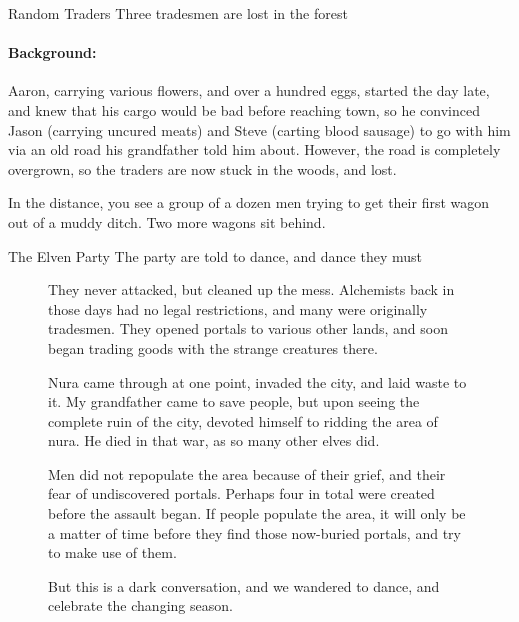 \begin{multicols}{2}
\begin{rollchart}
\end{rollchart}

{Random Traders}%
{Three tradesmen are lost in the forest}%

\paragraph{Background:}
Aaron, carrying various flowers, and over a hundred eggs, started the day late, and knew that his cargo would be bad before reaching \gls{town}, so he convinced Jason (carrying uncured meats) and Steve (carting blood sausage) to go with him via an old road his grandfather told him about.
However, the road is completely overgrown, so the traders are now stuck in the woods, and lost.

\begin{boxtext}
  In the distance, you see a group of a dozen men trying to get their first wagon out of a muddy ditch.
  Two more wagons sit behind.
\end{boxtext}


{The Elven Party}%
{The party are told to dance, and dance they must}%

\begin{figure*}[b]
\begin{speechtext}

  They never attacked, but cleaned up the mess.  Alchemists back in those days had no legal restrictions, and many were originally tradesmen.  They opened portals to various other lands, and soon began trading goods with the strange creatures there.

  Nura came through at one point, invaded the city, and laid waste to it.  My grandfather came to save people, but upon seeing the complete ruin of the city, devoted himself to ridding the area of nura.  He died in that war, as so many other elves did.

  Men did not repopulate the area because of their grief, and their fear of undiscovered portals.
  Perhaps four in total were created before the assault began.
  If people populate the area, it will only be a matter of time before they find those now-buried portals, and try to make use of them.

  But this is a dark conversation, and we wandered to dance, and celebrate the changing season.

\end{speechtext}
\end{figure*}


\end{multicols}
